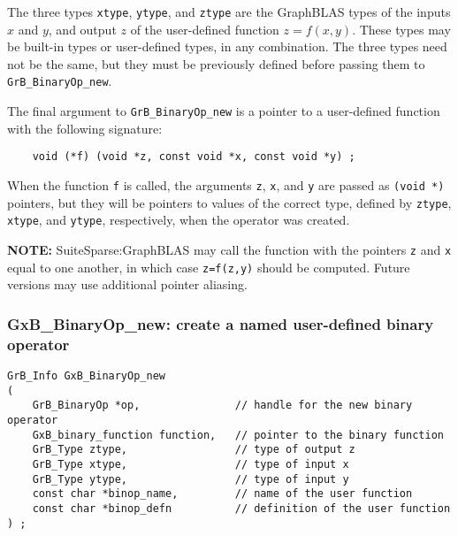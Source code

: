 \documentclass[12pt]{article}
\begin{document}
{The three types \verb'xtype', \verb'ytype', and \verb'ztype' are the GraphBLAS
types of the inputs $x$ and $y$, and output $z$ of the user-defined function
$z=f(x,y)$.  These types may be built-in types or user-defined types, in any
combination.  The three types need not be the same, but they must be previously
defined before passing them to \verb'GrB_BinaryOp_new'.

The final argument to \verb'GrB_BinaryOp_new' is a pointer to a user-defined
function with the following signature:

    {\footnotesize
    \begin{verbatim}
    void (*f) (void *z, const void *x, const void *y) ; \end{verbatim} }

When the function \verb'f' is called, the arguments \verb'z', \verb'x', and
\verb'y' are passed as \verb'(void *)' pointers, but they will be pointers to
values of the correct type, defined by \verb'ztype', \verb'xtype', and
\verb'ytype', respectively, when the operator was created.

{\bf NOTE:} SuiteSparse:GraphBLAS may call the function with the pointers
\verb'z' and \verb'x' equal to one another, in which case \verb'z=f(z,y)'
should be computed.  Future versions may use additional pointer aliasing.

\newpage
\subsubsection{{\sf GxB\_BinaryOp\_new:} create a named user-defined binary operator}
\label{binaryop_new_named}

\begin{mdframed}[userdefinedwidth=6in]
{\footnotesize
\begin{verbatim}
GrB_Info GxB_BinaryOp_new
(
    GrB_BinaryOp *op,               // handle for the new binary operator
    GxB_binary_function function,   // pointer to the binary function
    GrB_Type ztype,                 // type of output z
    GrB_Type xtype,                 // type of input x
    GrB_Type ytype,                 // type of input y
    const char *binop_name,         // name of the user function
    const char *binop_defn          // definition of the user function
) ;
\end{verbatim} }\end{mdframed}

}
\end{document}
